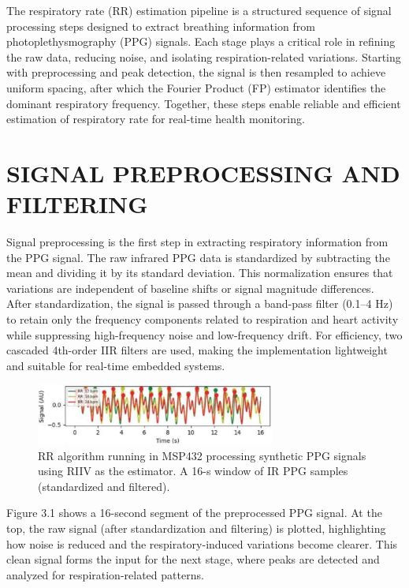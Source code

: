 \documentclass[12pt,a4paper]{report}
\begin{document}
The respiratory rate (RR) estimation pipeline is a structured sequence of signal processing steps designed to extract breathing information from photoplethysmography (PPG) signals. Each stage plays a critical role in refining the raw data, reducing noise, and isolating respiration-related variations. Starting with preprocessing and peak detection, the signal is then resampled to achieve uniform spacing, after which the Fourier Product (FP) estimator identifies the dominant respiratory frequency. Together, these steps enable reliable and efficient estimation of respiratory rate for real-time health monitoring.\\
\section{\large{SIGNAL PREPROCESSING AND FILTERING}}


 Signal preprocessing is the first step in extracting respiratory information from the PPG signal. The raw infrared PPG data is standardized by subtracting the mean and dividing it by its standard deviation. This normalization ensures that variations are independent of baseline shifts or signal magnitude differences.\\

 After standardization, the signal is passed through a band-pass filter (0.1–4 Hz) to retain only the frequency components related to respiration and heart activity while suppressing high-frequency noise and low-frequency drift. For efficiency, two cascaded 4th-order IIR filters are used, making the implementation lightweight and suitable for real-time embedded systems.\\
\begin{figure}[H]
    \centering
    \includegraphics[width=0.7\textwidth]{signal preprocessing.jpg}
    \caption {RR algorithm running in MSP432 processing synthetic PPG signals using RIIV as the estimator. A 16-s window of IR PPG
samples (standardized and filtered).}
    \label{5.10cm}
\end{figure}

 Figure 3.1 shows a 16-second segment of the preprocessed PPG signal. At the top, the raw signal (after standardization and filtering) is plotted, highlighting how noise is reduced and the respiratory-induced variations become clearer. This clean signal forms the input for the next stage, where peaks are detected and analyzed for respiration-related patterns.\\
\end{document}
